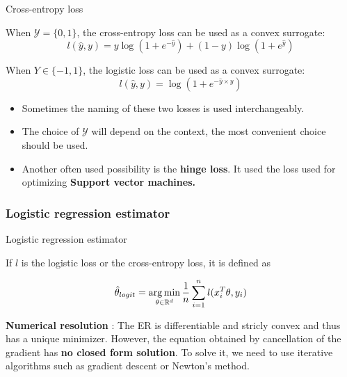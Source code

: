 \documentclass[
10pt, %
a4paper, %
oneside, %
headinclude,footinclude, %
BCOR5mm, %
]{scrartcl}
\begin{document}
\begin{definition}{Cross-entropy loss}

    When $ \mathcal{Y}  = \{0, 1\}$, the cross-entropy loss can be used as a convex surrogate:
    \label{loss:cross}
	\begin{equation}
	    l(\hat{y}, y) = y\log(1+e^{- \hat{y}})+ (1-y)\log(1+e^{ \hat{y}})
	\end{equation}
\end{definition}

\begin{definition}

    When $Y\in \{-1, 1\}$, the logistic loss can be used as a convex surrogate: 
	\begin{equation}
	    \label{loss:logistic}
	    l(\hat{y}, y) = \log(1+e^{- \hat{y}\times y})
	\end{equation}
\end{definition}

\begin{remark}
    \begin{itemize}
	\item Sometimes the naming of these two losses is used interchangeably.
        \item The choice of $ \mathcal{Y} $ will depend on the context, the most convenient choice should be used.
	\item Another often used possibility is the \textbf{{hinge loss}}. It used the loss used for optimizing \textbf{{Support vector machines.}} 
    \end{itemize}
\end{remark}


\subsubsection{\large\color{Periwinkle}Logistic regression estimator}

\begin{definition}{Logistic regression estimator}
    \label{def:logicest}

    If $l$ is the logistic loss or the cross-entropy loss, it is defined as

    \begin{equation}
	\hat{\theta}_{logit} = \operatorname*{arg\,min}_{\theta\in \mathbb{R}^d} \frac{1}{n} \sum^{n}_{i=1} l(x_i^T\theta, y_i) 
    \end{equation}
\end{definition}

\textbf{{Numerical resolution}} : The ER is differentiable and stricly convex and thus has a unique minimizer. However, the equation obtained by cancellation of the gradient has \textbf{{no closed form solution}}. To solve it, we need to use iterative algorithms such as gradient descent or Newton's method.
\end{document}
